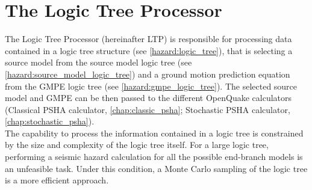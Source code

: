 \section{The Logic Tree Processor}
\label{hazard:logic_tree_processor}
The Logic Tree Processor (hereinafter LTP) is responsible for processing data contained in a logic tree structure (see \ref{hazard:logic_tree}), that is selecting a source model from the source model logic tree (see \ref{hazard:source_model_logic_tree}) and a ground motion prediction equation from the GMPE logic tree (see \ref{hazard:gmpe_logic_tree}). The selected source model and GMPE can be then passed to the different OpenQuake calculators (Classical PSHA calculator, \ref{chap:classic_psha}; Stochastic PSHA calculator, \ref{chap:stochastic_psha}).\\
The capability to process the information contained in a logic tree is constrained by the size and complexity of the logic tree itself. For a large logic tree, performing a seismic hazard calculation for all the possible end-branch models is an unfeasible task. Under this condition, a Monte Carlo sampling of the logic tree is a more efficient approach.\\
